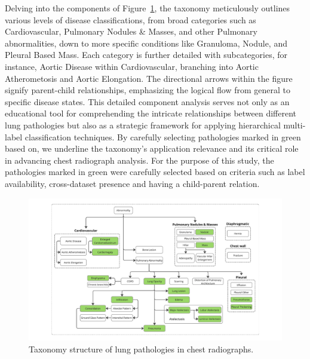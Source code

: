 \documentclass[review,1p,times,numbers]{elsarticle}
\begin{document}
Delving into the components of Figure~\ref{fig:taxonomy.fig.1.taxonomy_structure}, the taxonomy meticulously outlines various levels of disease classifications, from broad categories such as Cardiovascular, Pulmonary Nodules \& Masses, and other Pulmonary abnormalities, down to more specific conditions like Granuloma, Nodule, and Pleural Based Mass. Each category is further detailed with subcategories, for instance, Aortic Disease within Cardiovascular, branching into Aortic Atherometosis and Aortic Elongation. The directional arrows within the figure signify parent-child relationships, emphasizing the logical flow from general to specific disease states. This detailed component analysis serves not only as an educational tool for comprehending the intricate relationships between different lung pathologies but also as a strategic framework for applying hierarchical multi-label classification techniques. By carefully selecting pathologies marked in green based on, we underline the taxonomy's application relevance and its critical role in advancing chest radiograph analysis.
For the purpose of this study, the pathologies marked in green were carefully selected based on criteria such as label availability, cross-dataset presence and having a child-parent relation.
\begin{figure}[htbp]
    \centering
    \includegraphics[width=\textwidth]{figures/taxonomy_structure/taxonomy_structure.pdf}
    \caption[Taxonomy Structure of Lung Pathologies in Chest Radiographs]{Taxonomy structure of lung pathologies in chest radiographs.}\label{fig:taxonomy.fig.1.taxonomy_structure}
\end{figure}
\end{document}
